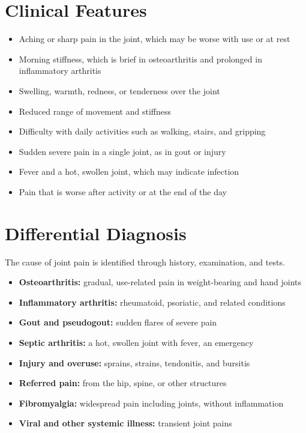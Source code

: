 \section*{Clinical Features}
\begin{itemize}
    \item Aching or sharp pain in the joint, which may be worse with use or at rest
    \item Morning stiffness, which is brief in osteoarthritis and prolonged in inflammatory arthritis
    \item Swelling, warmth, redness, or tenderness over the joint
    \item Reduced range of movement and stiffness
    \item Difficulty with daily activities such as walking, stairs, and gripping
    \item Sudden severe pain in a single joint, as in gout or injury
    \item Fever and a hot, swollen joint, which may indicate infection
    \item Pain that is worse after activity or at the end of the day
\end{itemize}

\section*{Differential Diagnosis}
The cause of joint pain is identified through history, examination, and tests.
\begin{itemize}
    \item \textbf{Osteoarthritis:} gradual, use-related pain in weight-bearing and hand joints
    \item \textbf{Inflammatory arthritis:} rheumatoid, psoriatic, and related conditions
    \item \textbf{Gout and pseudogout:} sudden flares of severe pain
    \item \textbf{Septic arthritis:} a hot, swollen joint with fever, an emergency
    \item \textbf{Injury and overuse:} sprains, strains, tendonitis, and bursitis
    \item \textbf{Referred pain:} from the hip, spine, or other structures
    \item \textbf{Fibromyalgia:} widespread pain including joints, without inflammation
    \item \textbf{Viral and other systemic illness:} transient joint pains
\end{itemize}

